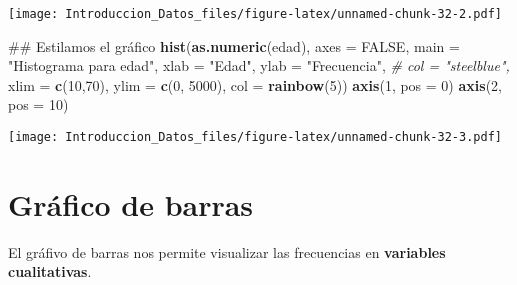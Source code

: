 \documentclass[spanish,]{book}
\newenvironment{Shaded}{\begin{snugshade}}{\end{snugshade}}
\newcommand{\KeywordTok}[1]{\textcolor[rgb]{0.13,0.29,0.53}{\textbf{#1}}}
\newcommand{\DataTypeTok}[1]{\textcolor[rgb]{0.13,0.29,0.53}{#1}}
\newcommand{\DecValTok}[1]{\textcolor[rgb]{0.00,0.00,0.81}{#1}}
\newcommand{\StringTok}[1]{\textcolor[rgb]{0.31,0.60,0.02}{#1}}
\newcommand{\CommentTok}[1]{\textcolor[rgb]{0.56,0.35,0.01}{\textit{#1}}}
\newcommand{\OtherTok}[1]{\textcolor[rgb]{0.56,0.35,0.01}{#1}}
\newcommand{\OperatorTok}[1]{\textcolor[rgb]{0.81,0.36,0.00}{\textbf{#1}}}
\newcommand{\NormalTok}[1]{#1}
\begin{document}
\texttt{[image: Introduccion\_Datos\_files/figure-latex/unnamed-chunk-32-2.pdf]}

\begin{Shaded}
\begin{Highlighting}[]
\NormalTok{## Estilamos el gráfico}
\KeywordTok{hist}\NormalTok{(}\KeywordTok{as.numeric}\NormalTok{(edad),}
     \DataTypeTok{axes =} \OtherTok{FALSE}\NormalTok{,}
     \DataTypeTok{main =} \StringTok{"Histograma para edad"}\NormalTok{,}
     \DataTypeTok{xlab =} \StringTok{"Edad"}\NormalTok{,}
     \DataTypeTok{ylab =} \StringTok{"Frecuencia"}\NormalTok{,}
     \CommentTok{# col = "steelblue",}
     \DataTypeTok{xlim =} \KeywordTok{c}\NormalTok{(}\DecValTok{10}\NormalTok{,}\DecValTok{70}\NormalTok{),}
     \DataTypeTok{ylim =} \KeywordTok{c}\NormalTok{(}\DecValTok{0}\NormalTok{, }\DecValTok{5000}\NormalTok{),}
     \DataTypeTok{col =} \KeywordTok{rainbow}\NormalTok{(}\DecValTok{5}\NormalTok{))}
\KeywordTok{axis}\NormalTok{(}\DecValTok{1}\NormalTok{, }\DataTypeTok{pos =} \DecValTok{0}\NormalTok{)}
\KeywordTok{axis}\NormalTok{(}\DecValTok{2}\NormalTok{, }\DataTypeTok{pos =} \DecValTok{10}\NormalTok{)}
\end{Highlighting}
\end{Shaded}

\texttt{[image: Introduccion\_Datos\_files/figure-latex/unnamed-chunk-32-3.pdf]}

\section{Gráfico de barras}\label{grafico-de-barras}

El gráfivo de barras nos permite visualizar las frecuencias en
\textbf{variables cualitativas}.

\begin{Shaded}
\end{Shaded}
\end{document}

